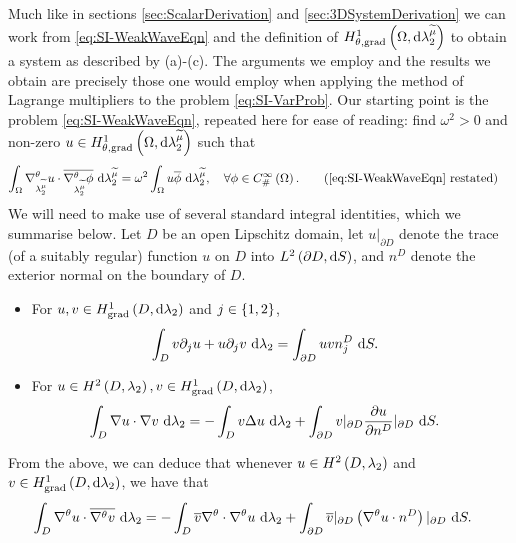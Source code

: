 Much like in sections \ref{sec:ScalarDerivation} and \ref{sec:3DSystemDerivation} we can work from \eqref{eq:SI-WeakWaveEqn} and the definition of $H^1_{\theta, \mathrm{grad}}\left( \Omega, \mathrm{d}\lambda_2^{\widetilde{\mu}} \right)$ to obtain a system as described by (a)-(c).
The arguments we employ and the results we obtain are precisely those one would employ when applying the method of Lagrange multipliers to the problem \eqref{eq:SI-VarProb}.
Our starting point is the problem \eqref{eq:SI-WeakWaveEqn}, repeated here for ease of reading: find $\omega^2>0$ and non-zero $u\in H^1_{\theta, \mathrm{grad}}\left( \Omega, \mathrm{d}\lambda_2^{\widetilde{\mu}} \right)$ such that
\begin{align*}
	\integral{\ddom}{ \tgrad_{\ccompMes}u\cdot\overline{\tgrad_{\ccompMes}\phi} }{\ccompMes}
	&= \omega^2 \integral{\ddom}{ u\overline{\phi} }{\ccompMes}, \quad\forall\phi\in\psmooth{\ddom}. \tag{\eqref{eq:SI-WeakWaveEqn} restated}
\end{align*}
We will need to make use of several standard integral identities, which we summarise below.
Let $D$ be an open Lipschitz domain, let $u\vert_{\partial D}$ denote the trace (of a suitably regular) function $u$ on $D$ into $L^{2}\left( \partial D,\mathrm{d} S \right)$, and $n^D$ denote the exterior normal on the boundary of $D$.
\begin{itemize}
	\item For $u,v\in H^1_\mathrm{grad}\left( D, \mathrm{d}\lambda_2 \right)$ and $j\in\left\{ 1,2 \right\}$,
	\begin{align*}
		\int_{D} v\partial_j u + u\partial_j v  \ \mathrm{d}\lambda_2
		&= \int_{\partial D} u v n^D_j  \ \mathrm{d}S.
	\end{align*}
	\item For $u\in H^2\left( D,\lambda_2 \right), v\in H^1_\mathrm{grad}\left( D, \mathrm{d}\lambda_2 \right)$,
	\begin{align*}
		\int_{D} \nabla u\cdot \nabla v  \ \mathrm{d}\lambda_2 
		&=  - \int_{D} v\Delta u  \ \mathrm{d}\lambda_2 + \int_{\partial D} v\vert_{\partial D}\dfrac{\partial u}{\partial n^D}\vert_{\partial D}  \ \mathrm{d}S.
	\end{align*}
\end{itemize}
From the above, we can deduce that whenever $u\in H^2\left( D,\lambda_2 \right)$ and $v\in H^1_\mathrm{grad}\left( D, \mathrm{d}\lambda_2 \right)$, we have that
\begin{align*}
	\int_{D} \nabla^{\theta} u\cdot\overline{\nabla^{\theta} v}  \ \mathrm{d}\lambda_2
	&= - \int_{D} \overline{v}\nabla^{\theta}\cdot\nabla^{\theta} u  \ \mathrm{d}\lambda_2 + \int_{\partial D} \overline{v}\vert_{\partial D}\left( \nabla^{\theta} u\cdot n^D \right)\vert_{\partial D}  \ \mathrm{d}S.
\end{align*}

